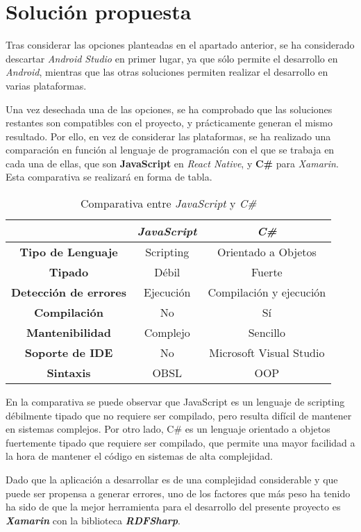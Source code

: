 
\section{Solución propuesta}
Tras considerar las opciones planteadas en el apartado anterior, se ha considerado descartar \textit{Android Studio} en 
primer lugar, ya que sólo permite el desarrollo en \textit{Android}, mientras que las otras soluciones permiten realizar 
el desarrollo en varias plataformas. \medskip

Una vez desechada una de las opciones, se ha comprobado que las soluciones restantes son compatibles con el proyecto, y 
prácticamente generan el mismo resultado. Por ello, en vez de considerar las plataformas, se ha realizado una comparación 
en función al lenguaje de programación con el que se trabaja en cada una de ellas, que son \textbf{JavaScript} en 
\textit{React Native}, y \textbf{C\#} para \textit{Xamarin}. Esta comparativa se realizará en forma de tabla.\bigskip

\begin{table}[htb]
\centering
\caption{Comparativa entre \textit{JavaScript} y \textit{C\#}}
\bigskip
\begin{tabular}{|c|c|c|}
    \hline
    & \textit{\textbf{JavaScript}} & \textbf{\textit{C\#}} \\ \hline \hline
    \textbf{Tipo de Lenguaje} & Scripting & Orientado a Objetos \\ \hline
    \textbf{Tipado} & Débil & Fuerte \\ \hline
    \textbf{Detección de errores} & Ejecución & Compilación y ejecución \\ \hline
    \textbf{Compilación} & No & Sí \\ \hline
    \textbf{Mantenibilidad} & Complejo & Sencillo \\ \hline
    \textbf{Soporte de IDE} & No & Microsoft Visual Studio \\ \hline
    \textbf{Sintaxis} & OBSL & OOP \\ \hline
\end{tabular}
\end{table}  

En la comparativa se puede observar que JavaScript es un lenguaje de scripting débilmente tipado que 
no requiere ser compilado, pero resulta difícil de mantener en sistemas complejos. Por otro lado, 
C\# es un lenguaje orientado a objetos fuertemente tipado que requiere ser compilado, que permite 
una mayor facilidad a la hora de mantener el código en sistemas de alta complejidad.

Dado que la aplicación a desarrollar es de una complejidad considerable y que puede ser propensa 
a generar errores, uno de los factores que más peso ha tenido ha sido 
de que la mejor herramienta para el desarrollo del presente proyecto es \textit{\textbf{Xamarin}} con 
la biblioteca \textit{\textbf{RDFSharp}}.